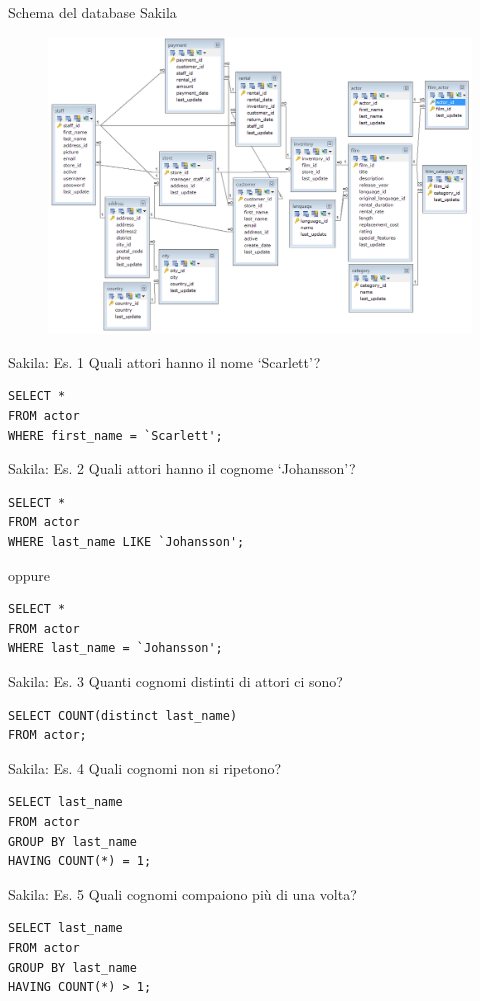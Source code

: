 \begin{frame}[fragile]{Schema del database Sakila}
\begin{figure}
    \centering
        \includegraphics[width=.65\textwidth]{img/db-sakila.png}
    \end{figure}
\end{frame}
%
\begin{frame}[fragile]{Sakila: Es. 1}
Quali attori hanno il nome `Scarlett'?
\pause
\begin{lstlisting}
SELECT *
FROM actor
WHERE first_name = `Scarlett';
\end{lstlisting}
\end{frame}
%
\begin{frame}[fragile]{Sakila: Es. 2}
Quali attori hanno il cognome `Johansson'?
\pause
\begin{lstlisting}
SELECT *
FROM actor
WHERE last_name LIKE `Johansson';
\end{lstlisting}
\pause
oppure
\begin{lstlisting}
SELECT *
FROM actor
WHERE last_name = `Johansson';
\end{lstlisting}
\end{frame}
%
\begin{frame}[fragile]{Sakila: Es. 3}
Quanti cognomi distinti di attori ci sono?
\pause
\begin{lstlisting}
SELECT COUNT(distinct last_name)
FROM actor;
\end{lstlisting}
\end{frame}
%
\begin{frame}[fragile]{Sakila: Es. 4}
Quali cognomi non si ripetono?
\pause
\begin{lstlisting}
SELECT last_name
FROM actor
GROUP BY last_name
HAVING COUNT(*) = 1;
\end{lstlisting}
\end{frame}
%
\begin{frame}[fragile]{Sakila: Es. 5}
Quali cognomi compaiono pi\`u di una volta?
\pause
\begin{lstlisting}
SELECT last_name
FROM actor
GROUP BY last_name
HAVING COUNT(*) > 1;
\end{lstlisting}
\end{frame}
